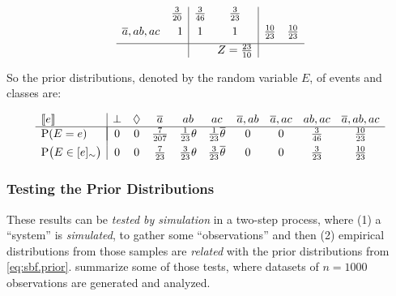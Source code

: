 \documentclass[a4paper, 10pt]{article}
\newcommand{\at}[1]{\ensuremath{\!\del{#1}}}
\newcommand{\co}[1]{\ensuremath{\overline{#1}}}
\newcommand{\stablecore}[1]{\ensuremath{\left\llbracket #1 \right\rrbracket}}
\newcommand{\pr}[1]{\ensuremath{\mathrm{P}\at{#1}}}
\newcommand{\class}[1]{\ensuremath{[{#1}]_{\sim}}}
\newcommand{\inconsistent}{\bot}
\newcommand{\indepclass}{\ensuremath{\Diamond}}
\begin{document}
\begin{description}
\begin{equation*}
\begin{array}{lr|cc|cc}
                   & \frac{3}{20}
                   & \frac{3}{46}
                   & \frac{3}{23}
                  \\[4pt]
                  \co{a}, ab, ac
                   & 1
                   & 1
                   & 1
                   & \frac{10}{23}
                   & \frac{10}{23}
                  \\[4pt]
                  \hline
                   &
                   &
                   & Z = \frac{23}{10}
                   &
              \end{array}
          \end{equation*}
\end{description}

So the prior distributions, denoted by the random variable $E$, of events and classes are:

\begin{equation}
    \begin{array}{l|ccccccccc}
        \stablecore{e}          &
        \inconsistent           &
        \indepclass             &
        \co{a}                  &
        ab                      &
        ac                      &
        \co{a}, ab              &
        \co{a}, ac              &
        ab, ac                  &
        \co{a}, ab, ac
        \\ \hline\\[-12pt]

        \pr{E = e}              &
        0                       &
        0                       &
        \frac{7}{207}           &
        \frac{1}{23}\theta      &
        \frac{1}{23}\co{\theta} &
        0                       &
        0                       &
        \frac{3}{46}            &
        \frac{10}{23}
        \\[4pt]

        \pr{E \in \class{e}}    &
        0                       &
        0                       &
        \frac{7}{23}            &
        \frac{3}{23}\theta      &
        \frac{3}{23}\co{\theta} &
        0                       &
        0                       &
        \frac{3}{23}            &
        \frac{10}{23}
    \end{array}\label{eq:sbf.prior}
\end{equation}
%
%
%
\subsubsection*{Testing the Prior Distributions}
%
%
%
These results can be \emph{tested by simulation} in a two-step process, where (1) a ``system'' is \emph{simulated}, to gather some ``observations'' and then (2) empirical distributions from those samples are \emph{related} with the prior distributions from \cref{eq:sbf.prior}.  summarize some of those tests, where datasets of $n = 1000$ observations are generated and analyzed.
\end{document}
